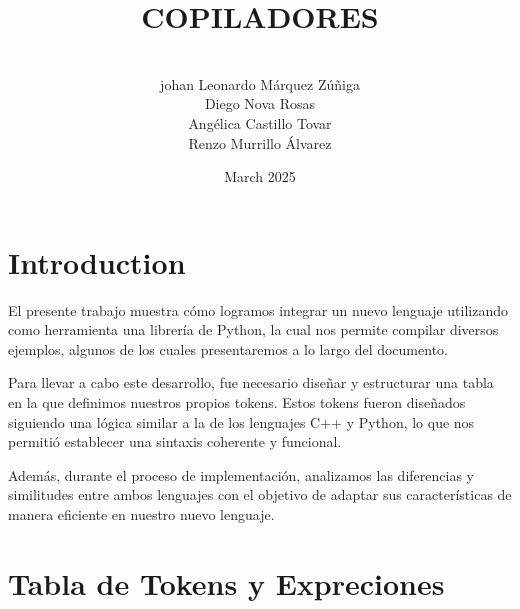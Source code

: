 \documentclass{article}
\title{COPILADORES}
\author{\\johan Leonardo Márquez Zúñiga \\ Diego Nova Rosas \\ Angélica Castillo Tovar \\ Renzo Murrillo Álvarez}
\date{March 2025}
\begin{document}
\maketitle

\section{Introduction}

El presente trabajo muestra cómo logramos integrar un nuevo lenguaje utilizando como herramienta una librería de Python, la cual nos permite compilar diversos ejemplos, algunos de los cuales presentaremos a lo largo del documento. 

Para llevar a cabo este desarrollo, fue necesario diseñar y estructurar una tabla en la que definimos nuestros propios tokens. Estos tokens fueron diseñados siguiendo una lógica similar a la de los lenguajes C++ y Python, lo que nos permitió establecer una sintaxis coherente y funcional. 

Además, durante el proceso de implementación, analizamos las diferencias y similitudes entre ambos lenguajes con el objetivo de adaptar sus características de manera eficiente en nuestro nuevo lenguaje.

\section{Tabla de Tokens y Expreciones}

\renewcommand{\arraystretch}{1.3} %
\end{document}
